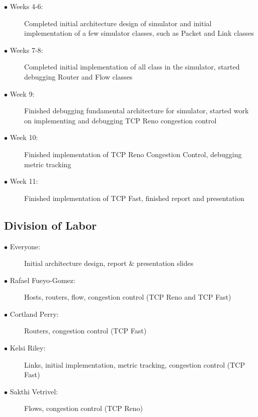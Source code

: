 \documentclass{article}
\begin{document}
\begin{description}
  \item[$\bullet$ Weeks 4-6:] Completed initial architecture design of simulator and initial implementation of a few simulator classes, such as Packet and Link classes
  \item[$\bullet$ Weeks 7-8:] Completed initial implementation of all class in the simulator, started debugging Router and Flow classes 
  \item[$\bullet$ Week 9:] Finished debugging fundamental architecture for simulator, started work on implementing and debugging TCP Reno congestion control
  \item[$\bullet$ Week 10:] Finished implementation of TCP Reno Congestion Control, debugging metric tracking
  \item[$\bullet$ Week 11:] Finished implementation of TCP Fast, finished report and presentation
\end{description}

\subsection{Division of Labor}

\begin{description}
    \item[$\bullet$ Everyone:] Initial architecture design, report \& presentation slides
	\item[$\bullet$ Rafael Fueyo-Gomez:] Hosts, routers, flow, congestion control (TCP Reno and TCP Fast)
	\item[$\bullet$ Cortland Perry:] Routers, congestion control (TCP Fast)
	\item[$\bullet$ Kelsi Riley:] Links, initial implementation, metric tracking, congestion control (TCP Fast)
	\item[$\bullet$ Sakthi Vetrivel:] Flows, congestion control (TCP Reno) 
\end{description}
\end{document}
